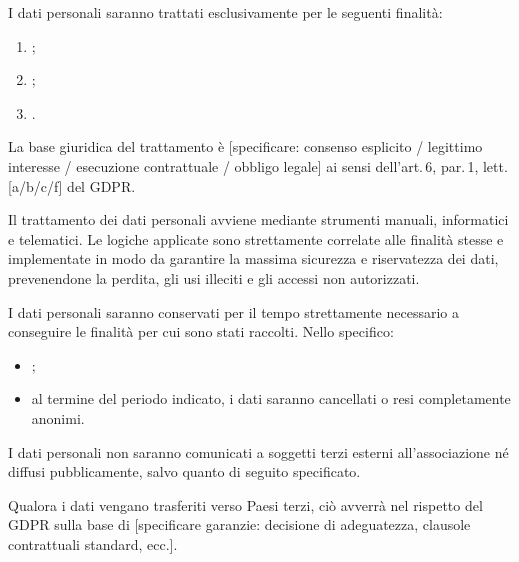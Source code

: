 \documentclass[legal]{../core/polinetwork}
\begin{document}
I dati personali saranno trattati esclusivamente per le seguenti finalità:

\begin{enumerate}
  \item [Finalità 1];
  \item [Finalità 2];
  \item [Finalità 3].
\end{enumerate}

La base giuridica del trattamento è [specificare: consenso esplicito / legittimo
interesse / esecuzione contrattuale / obbligo legale] ai sensi dell'art.\,6,
par.\,1, lett.\,[a/b/c/f] del GDPR.


Il trattamento dei dati personali avviene mediante strumenti manuali, informatici
e telematici. Le logiche applicate sono strettamente correlate alle finalità stesse
e implementate in modo da garantire la massima sicurezza e riservatezza dei dati,
prevenendone la perdita, gli usi illeciti e gli accessi non autorizzati.


I dati personali saranno conservati per il tempo strettamente necessario a
conseguire le finalità per cui sono stati raccolti. Nello specifico:

\begin{itemize}
  \item [Specificare durata e condizioni di conservazione];
  \item al termine del periodo indicato, i dati saranno cancellati o resi
        completamente anonimi.
\end{itemize}


I dati personali non saranno comunicati a soggetti terzi esterni all'associazione
né diffusi pubblicamente, salvo quanto di seguito specificato.


Qualora i dati vengano trasferiti verso Paesi terzi, ciò avverrà nel rispetto
del GDPR sulla base di [specificare garanzie: decisione di adeguatezza,
clausole contrattuali standard, ecc.].

\end{document}
